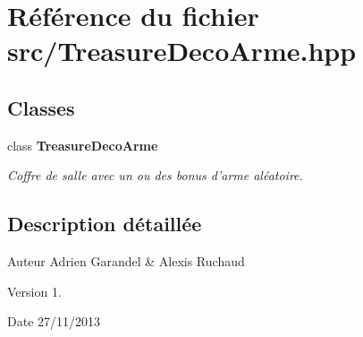 \section{Référence du fichier src/\-Treasure\-Deco\-Arme.hpp}
\label{_treasure_deco_arme_8hpp}
\subsection*{Classes}
\begin{DoxyCompactItemize}
\item 
class {\bf Treasure\-Deco\-Arme}
\begin{DoxyCompactList}\small\item\em Coffre de salle avec un ou des bonus d'arme aléatoire. \end{DoxyCompactList}\end{DoxyCompactItemize}


\subsection{Description détaillée}
\begin{DoxyAuthor}{Auteur}
Adrien Garandel \& Alexis Ruchaud 
\end{DoxyAuthor}
\begin{DoxyVersion}{Version}
1. 
\end{DoxyVersion}
\begin{DoxyDate}{Date}
27/11/2013 
\end{DoxyDate}
